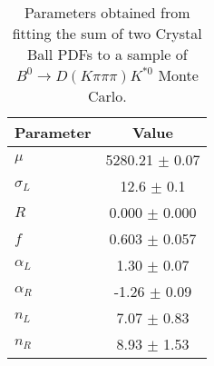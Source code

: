 \begin{table}[h]
  \centering
  \begin{tabular}{lc}
      \toprule
      Parameter & Value \\
      \midrule
      $\mu$ & 5280.21 $\pm$ 0.07 \\
      $\sigma_L$ & 12.6 $\pm$ 0.1 \\
      $R$ & 0.000 $\pm$ 0.000 \\
      $f$ & 0.603 $\pm$ 0.057 \\
      $\alpha_L$ & 1.30 $\pm$ 0.07 \\
      $\alpha_R$ & -1.26 $\pm$ 0.09 \\
      $n_L$ & 7.07 $\pm$ 0.83 \\
      $n_R$ & 8.93 $\pm$ 1.53 \\
  \bottomrule
  \end{tabular}
  \caption{Parameters obtained from fitting the sum of two Crystal Ball PDFs to a sample of $B^0 \to D(K\pi\pi\pi)K^{*0}$ Monte Carlo.}
\label{tab:signal_Kpipipi_MC_params}
\end{table}
